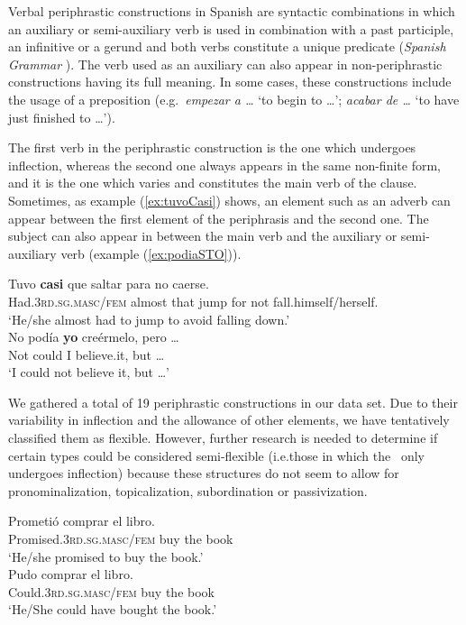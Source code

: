 \documentclass[output=paper]{langsci/langscibook}
\begin{document}
Verbal periphrastic constructions in Spanish are syntactic combinations in which an auxiliary or semi-auxiliary verb is used in combination with a past participle, an infinitive or a gerund and both verbs constitute a unique predicate (\textit{Spanish Grammar} \citeyear[529]{RAE:2010}).
The verb used as an auxiliary can also appear in non-periphrastic constructions having its full meaning.
In some cases, these constructions include the usage of a preposition (e.g.\ \textit{empezar a \ldots} `to begin to \ldots'; \textit{acabar de \ldots} `to have just finished to \ldots').

The first verb in the periphrastic construction is the one which undergoes inflection, whereas the second one always appears in the same non-finite form, and it is the one which varies and constitutes the main verb of the clause.
Sometimes, as example (\ref{ex:tuvoCasi}) shows, an element such as an adverb can appear between the first element of the periphrasis and the second one.
The subject can also appear in between the main verb and the auxiliary or semi-auxiliary verb (example (\ref{ex:podiaSTO})).

\begin{exe}
    \ex \label{ex:tuvoCasi}
	\gll Tuvo \textbf{casi} que saltar para no caerse.\\
	Had.\textsc{3rd.sg.masc/fem} almost that jump for not fall.himself/herself. \\
	\glt `He/she almost had to jump to avoid falling down.' \\
	\ex \label{ex:podiaSTO}
	\gll No podía \textbf{yo} creérmelo, pero \ldots\\
	Not could I believe.it, but \ldots \\
	\glt `I could not believe it, but \ldots'
\end{exe} 

We gathered a total of 19 periphrastic constructions in our data set.
Due to their variability in inflection and the allowance of other elements, we have tentatively classified them as flexible.
However, further research is needed to determine if certain types could be considered semi-flexible (i.e.\@ those in which the \mwe\ only undergoes inflection) because these structures do not seem to allow for pronominalization, topicalization, subordination or passivization.

\begin{exe}
    \ex \label{ex:prometerINF}
	\gll Prometió comprar el libro.\\
	{Promised.\textsc{3rd.sg.masc/fem}} buy the book \\
	\glt `He/she promised to buy the book.' \\
	\ex \label{ex:poderINF}
	\gll Pudo comprar el libro.\\
	{Could.\textsc{3rd.sg.masc/fem}} buy the book \\
	\glt `He/She could have bought the book.'
\end{exe} 
\end{document}
